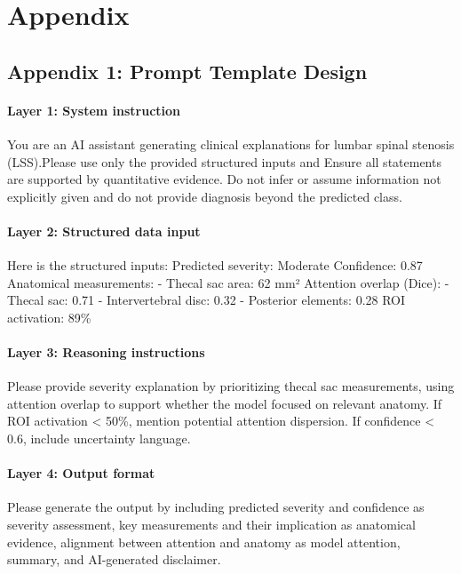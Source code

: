 \documentclass[12pt]{article}
\begin{document}
\clearpage
\appendix
\section{Appendix}
\subsection{Appendix 1: Prompt Template Design}
\paragraph{Layer 1: System instruction}
You are an AI assistant generating clinical explanations for lumbar spinal stenosis (LSS).Please use only the provided structured inputs and Ensure all statements are supported by quantitative evidence. Do not infer or assume information not explicitly given and do not provide diagnosis beyond the predicted class.
\paragraph{Layer 2: Structured data input}
Here is the structured inputs:
Predicted severity: Moderate
Confidence: 0.87
Anatomical measurements:
- Thecal sac area: 62 mm²
Attention overlap (Dice):
- Thecal sac: 0.71
- Intervertebral disc: 0.32
- Posterior elements: 0.28
ROI activation: 89\%
\paragraph{Layer 3: Reasoning instructions}
Please provide severity explanation by prioritizing thecal sac measurements, using attention overlap to support whether the model focused on relevant anatomy. If ROI activation < 50\%, mention potential attention dispersion. If confidence < 0.6, include uncertainty language.
\paragraph{Layer 4: Output format}
Please generate the output by including predicted severity and confidence as severity assessment, key measurements and their implication as anatomical evidence, alignment between attention and anatomy as model attention, summary, and AI-generated disclaimer.

\clearpage


\end{document}
